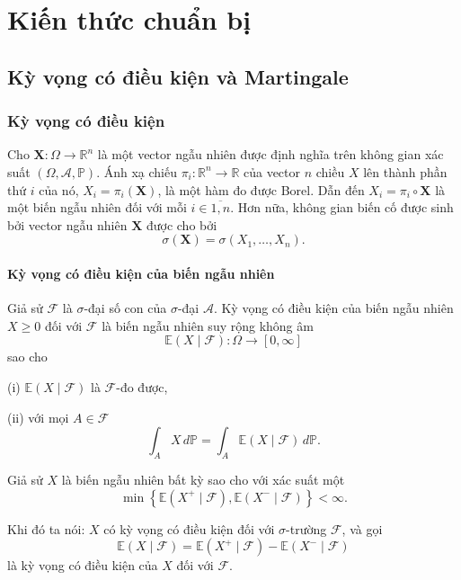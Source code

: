 \chapter{Kiến thức chuẩn bị}
\section{Kỳ vọng có điều kiện và Martingale}
\subsection{Kỳ vọng có điều kiện}
{\dn Cho $\mathbf{X}: \Omega \rightarrow \mathbb{R}^{n}$ là một vector ngẫu nhiên được định nghĩa trên không gian xác suất $(\Omega, \mathcal{A}, \mathbb{P})$. Ánh xạ chiếu $\pi_{i}: \mathbb{R}^{n} \rightarrow \mathbb{R}$ của vector $n$ chiều $X$ lên thành phần thứ $i$ của nó, $X_{i}=\pi_{i}(\mathbf{X})$, là một hàm đo được Borel. Dẫn đến $X_{i}=\pi_{i} \circ \mathbf{X}$ là một biến ngẫu nhiên đối với mỗi $i \in \overline{1,n}$. Hơn nữa, không gian biến cố được sinh bởi vector ngẫu nhiên $\mathbf{X}$ được cho bởi
$$
\sigma(\mathbf{X})=\sigma\left(X_{1}, \ldots, X_{n}\right) .
$$}
\subsubsection{Kỳ vọng có điều kiện của biến ngẫu nhiên}
\quad Giả sử $\mathcal{F}$ là $\sigma$-đại số con của $\sigma$-đại  $\mathcal{A}$.
    Kỳ vọng có điều kiện của biến ngẫu nhiên $X \geq 0$ đối với $\mathcal{F}$ là biến ngẫu nhiên suy rộng không âm
\[
\mathbb{E}(X \mid \mathcal{F}): \Omega \rightarrow[0, \infty]
\]
sao cho

(i) $\mathbb{E}(X \mid \mathcal{F})$ là $\mathcal{F}$-đo được,

(ii) với mọi $A \in \mathcal{F}$
\[
\int_A X \, d\mathbb{P} = \int_A \mathbb{E}(X \mid \mathcal{F}) \, d\mathbb{P} .
\]

Giả sử $X$ là biến ngẫu nhiên bất kỳ sao cho với xác suất một
\[
\min \left\{\mathbb{E}\left(X^{+} \mid \mathcal{F}\right), \mathbb{E}\left(X^{-} \mid \mathcal{F}\right)\right\}<\infty .
\]

Khi đó ta nói: $X$ có kỳ vọng có điều kiện đối với $\sigma$-trường $\mathcal{F}$, và gọi
\[
\mathbb{E}(X \mid \mathcal{F})=\mathbb{E}\left(X^{+} \mid \mathcal{F}\right)-\mathbb{E}\left(X^{-} \mid \mathcal{F}\right)
\]
là kỳ vọng có điều kiện của $X$ đối với $\mathcal{F}$.

